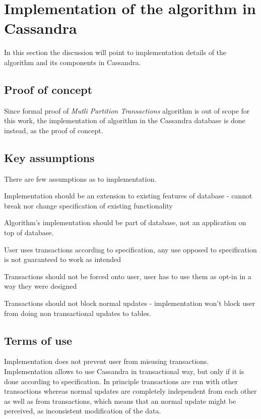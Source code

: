 
\chapter{Implementation of the algorithm in Cassandra}\label{sec:mpp:impl}
In this section the discussion will point to implementation details of the algorithm and its components in Cassandra. 


\section{Proof of concept}
Since formal proof of \emph{Mutli Partition Transactions} algorithm is out of scope for this work, the implementation of algorithm in the Cassandra database is done instead, as the proof of concept. 

\section{Key assumptions}
There are few assumptions as to implementation.
\begin{enumerate*}
\item  Implementation should be an extension to existing features of database - cannot break nor change specification of existing functionality
\item Algorithm’s implementation should be part of database, not an application on top of database.
\item User uses transactions according to specification, any use opposed to specification is not guaranteed to work as intended
\item Transactions should not be forced onto user, user has to use them as opt-in in a way they were designed
\item Transactions should not block normal updates - implementation won’t block user from doing non transactional updates to tables.
\end{enumerate*}

\section{Terms of use}
Implementation does not prevent user from misusing transactions. Implementation allows to use Cassandra in transactional way, but only if it is done according to specification. In principle transactions are run with other transactions whereas normal updates are completely independent from each other as well as from transactions, which means that an normal update might be perceived, as inconsistent modification of the data.

